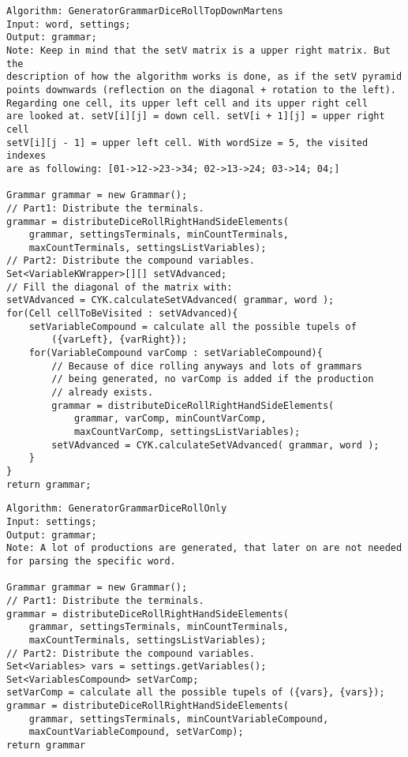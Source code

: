 \lstset{language=java}
\begin{lstlisting}[frame=htrbl,caption={GeneratorGrammarDiceRollTopDownMartens}, 
label={lst:GeneratorGrammarDiceRollTopDownMartens}]
Algorithm: GeneratorGrammarDiceRollTopDownMartens
Input: word, settings;
Output: grammar;
Note: Keep in mind that the setV matrix is a upper right matrix. But the
description of how the algorithm works is done, as if the setV pyramid 
points downwards (reflection on the diagonal + rotation to the left).
Regarding one cell, its upper left cell and its upper right cell 
are looked at. setV[i][j] = down cell. setV[i + 1][j] = upper right cell
setV[i][j - 1] = upper left cell. With wordSize = 5, the visited indexes 
are as following: [01->12->23->34; 02->13->24; 03->14; 04;]

Grammar grammar = new Grammar();
// Part1: Distribute the terminals.
grammar = distributeDiceRollRightHandSideElements(
	grammar, settingsTerminals, minCountTerminals, 
	maxCountTerminals, settingsListVariables);
// Part2: Distribute the compound variables.
Set<VariableKWrapper>[][] setVAdvanced;
// Fill the diagonal of the matrix with:
setVAdvanced = CYK.calculateSetVAdvanced( grammar, word );
for(Cell cellToBeVisited : setVAdvanced){
	setVariableCompound = calculate all the possible tupels of 
		({varLeft}, {varRight});
	for(VariableCompound varComp : setVariableCompound){
		// Because of dice rolling anyways and lots of grammars 
		// being generated, no varComp is added if the production
		// already exists.
		grammar = distributeDiceRollRightHandSideElements(
			grammar, varComp, minCountVarComp, 
			maxCountVarComp, settingsListVariables);
		setVAdvanced = CYK.calculateSetVAdvanced( grammar, word );
	}
}
return grammar;
\end{lstlisting}
\pagebreak

\lstset{language=java}
\begin{lstlisting}[frame=htrbl,caption={GeneratorGrammarDiceRollOnly}, 
label={lst:GeneratorGrammarDiceRollOnly}]
Algorithm: GeneratorGrammarDiceRollOnly
Input: settings;
Output: grammar;
Note: A lot of productions are generated, that later on are not needed
for parsing the specific word.

Grammar grammar = new Grammar();
// Part1: Distribute the terminals.
grammar = distributeDiceRollRightHandSideElements(
	grammar, settingsTerminals, minCountTerminals, 
	maxCountTerminals, settingsListVariables);
// Part2: Distribute the compound variables.
Set<Variables> vars = settings.getVariables();
Set<VariablesCompound> setVarComp;
setVarComp = calculate all the possible tupels of ({vars}, {vars});
grammar = distributeDiceRollRightHandSideElements(
	grammar, settingsTerminals, minCountVariableCompound, 
	maxCountVariableCompound, setVarComp);
return grammar
\end{lstlisting}

